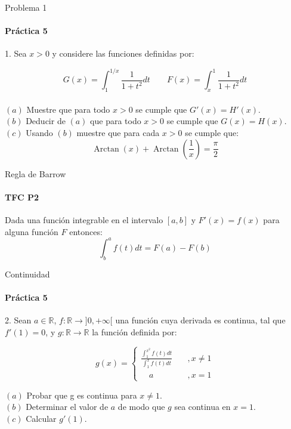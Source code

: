 \documentclass{plantillaPPT}
\begin{document}
\primeraDiapo

\begin{frame}{Problema 1}
    \framesubtitle{Práctica 5}

1. Sea \(x>0\) y considere las funciones definidas por:

\[G(x) = \int_{1}^{1/x} \frac{1}{1+t^2}dt \qquad F(x) = \int_{x}^{1} \frac{1}{1+t^2}dt\] \vspace{0.2cm} \\
\((a)\) Muestre que para todo \(x>0\) se cumple que \(G'(x)=H'(x)\).\\
\((b)\) Deducir de \((a)\) que para todo \(x>0\) se cumple que \(G(x)=H(x)\).\\
\((c)\) Usando \((b)\) muestre que para cada \(x>0\) se cumple que:
\[\operatorname{Arctan}(x) + \operatorname{Arctan}\left(\frac{1}{x}\right) = \frac{\pi}{2}\]
\end{frame}

\begin{frame}{Regla de Barrow}
    \framesubtitle{TFC P2}

\begin{definicion}
    Dada una función integrable en el intervalo \([a,b]\) y \(F'(x)=f(x)\) para alguna función \(F\) entonces:
    \[\int_{b}^{a}f(t)dt = F(a)-F(b)\]
\end{definicion}
    
\end{frame}

\begin{frame}{Continuidad}
    \framesubtitle{Práctica 5}
2. Sean \(a \in \mathbb{R}\), \(f: \mathbb{R} \to ]0,+\infty[\) una función cuya derivada es continua, tal que \(f'(1) = 0\), y \(g: \mathbb{R} \to \mathbb{R}\) la función definida por: \vspace{0.5cm}

\[
g(x) = \begin{cases}
    \frac{\int_{1}^{x^2} f(t)dt}{\int_{1}^{x}f(t)dt} \quad &,x\neq1 \\
    \quad a \quad &,x=1
\end{cases}
\] \vspace{0.5cm}

\((a)\) Probar que g es continua para \(x\neq1\).\\
\((b)\) Determinar el valor de \(a\) de modo que \(g\) sea continua en \(x=1\). \\
\((c)\) Calcular \(g'(1)\).
    
\end{frame}
\end{document}
